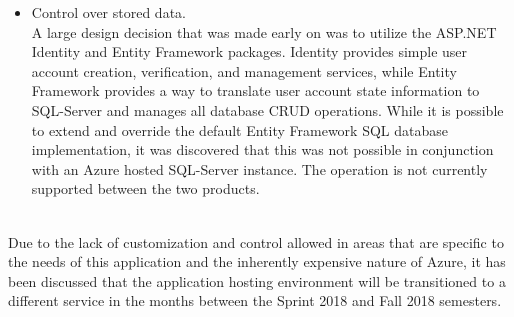 \begin{itemize}
    \item Control over stored data.\\

    A large design decision that was made early on was to utilize the ASP.NET Identity and Entity Framework packages.  
    Identity provides simple user account creation, verification, and management services, while Entity Framework provides a way to translate user account state information to SQL-Server and manages all database CRUD operations.
    While it is possible to extend and override the default Entity Framework SQL database implementation, it was discovered that this was not possible in conjunction with an Azure hosted SQL-Server instance.
    The operation is not currently supported between the two products.

\end{itemize}\ \\

Due to the lack of customization and control allowed in areas that are specific to the needs of this application and the inherently expensive nature of Azure, it has been discussed that the application hosting environment will be transitioned to a different service in the months between the Sprint 2018 and Fall 2018 semesters.